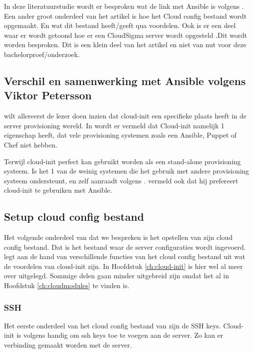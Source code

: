 In deze literatuurstudie wordt er besproken wat de link met Ansible is volgens \autocite{viktorpet}. Een ander groot onderdeel van het artikel is hoe het Cloud config bestand wordt opgemaakt. En wat dit bestand heeft/geeft qua voordelen. Ook is er een deel waar er wordt getoond hoe er een CloudSigma server wordt opgesteld .Dit wordt worden besproken. Dit is een klein deel van het artikel en niet van nut voor deze bachelorproef/onderzoek.

\subsection{Verschil en samenwerking met Ansible volgens Viktor Petersson}
\autocite{viktorpet} wilt allereerst de lezer doen inzien dat cloud-init een specifieke plaats heeft in de server provisioning wereld. In \autocite{viktorpet} wordt er vermeld dat Cloud-init namelijk 1 eigenschap heeft, dat vele provisioning systemen zoals een Ansible, Puppet of Chef niet hebben. 

Terwijl cloud-init perfect kan gebruikt worden als een stand-alone provisioning systeem. Is het 1 van de weinig systemen die het gebruik met andere provisioning systeem ondersteunt, en zelf aanraadt volgens \autocite{viktorpet}. \autocite{viktorpet} vermeld ook dat hij prefereert cloud-init te gebruiken met Ansible.

\subsection{Setup cloud config bestand}
Het volgende onderdeel van \autocite{viktorpet} dat we bespreken is het opstellen van zijn cloud config bestand. Dat is het bestand waar de server configuraties wordt ingevoerd. \autocite{viktorpet} legt aan de hand van verschillende functies van het cloud config bestand uit wat de voordelen van cloud-init zijn. In Hoofdstuk \ref*{ch:cloud-init} is hier wel al meer over uitgelegd. Sommige delen gaan minder uitgebreid zijn omdat het al in Hoofdstuk \ref*{ch:cloudmodules} te vinden is.

\subsubsection{SSH}
Het eerste onderdeel van het cloud config bestand van \autocite{viktorpet} zijn de SSH keys. Cloud-init is volgens \autocite{viktorpet} handig om ssh keys toe te voegen aan de server. Zo kan er verbinding gemaakt worden met de server. 

